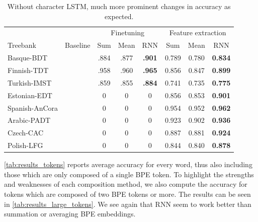 \documentclass[11pt]{article}
\begin{document}
    

	\begin{table}[h]
	\centering
	\begin{tabular}{l|c|ccc|ccc}
		& & \multicolumn{3}{c}{Finetuning} & \multicolumn{3}{c}{Feature extraction} \\
		Treebank & Baseline & Sum & Mean & RNN & Sum & Mean & RNN \\
		\hline
		Basque-BDT      & & .884 & .877 & \textbf{.901} & 0.789 & 0.780 & \textbf{0.834} \\
		Finnish-TDT     & & .958 & .960 & \textbf{.965} & 0.856 & 0.847 & \textbf{0.899} \\
		Turkish-IMST    & & .859 & .855 & \textbf{.884} & 0.741 & 0.735 & \textbf{0.775} \\
		Estonian-EDT    & & 0 & 0 & 0 & 0.856 & 0.853 & \textbf{0.901} \\
		Spanish-AnCora  & & 0 & 0 & 0 & 0.954 & 0.952 & \textbf{0.962} \\
		Arabic-PADT     & & 0 & 0 & 0 & 0.923 & 0.902 & \textbf{0.936} \\
		Czech-CAC       & & 0 & 0 & 0 & 0.887 & 0.881 & \textbf{0.924} \\
		Polish-LFG      & & 0 & 0 & 0 & 0.844 & 0.840 & \textbf{0.878} \\
		
	\end{tabular}
	\caption{\label{tab:results_tokens_nochars} Without character LSTM, much more prominent changes in accuracy as expected.}
    \end{table}

    \cref{tab:results_tokens} reports average accuracy for every word,
     thus also including those which are only composed of a single BPE
     token. To highlight the strengths and weaknesses of each
     composition method, we also compute the accuracy for tokens which
     are composed of two BPE tokens or more. The results can be seen
     in \cref{tab:results_large_tokens}.  We see again that RNN seem
     to work better than summation or averaging BPE embeddings.
\end{document}
